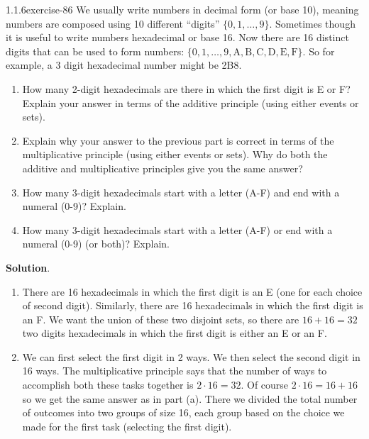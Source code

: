 \documentclass[twoside,11pt,]{book}
\numberwithin{equation}{chapter}
\begin{document}
\begin{divisionsolution}{1.1.6}{}{exercise-86}%
\hypertarget{p-1359}{}%
We usually write numbers in decimal form (or base 10), meaning numbers are composed using 10 different ``digits'' \(\{0,1,\ldots, 9\}\text{.}\) Sometimes though it is useful to write numbers hexadecimal or base 16. Now there are 16 distinct digits that can be used to form numbers: \(\{0, 1, \ldots, 9, \mathrm{A, B, C, D, E, F}\}\text{.}\) So for example, a 3 digit hexadecimal number might be 2B8.\leavevmode%
\begin{enumerate}[label=(\alph*)]
\item\hypertarget{li-1012}{}\hypertarget{p-1360}{}%
How many 2-digit hexadecimals are there in which the first digit is E or F? Explain your answer in terms of the additive principle (using either events or sets).%
\item\hypertarget{li-1013}{}\hypertarget{p-1362}{}%
Explain why your answer to the previous part is correct in terms of the multiplicative principle (using either events or sets). Why do both the additive and multiplicative principles give you the same answer?%
\item\hypertarget{li-1014}{}\hypertarget{p-1363}{}%
How many 3-digit hexadecimals start with a letter (A-F) and end with a numeral (0-9)? Explain.%
\item\hypertarget{li-1015}{}\hypertarget{p-1365}{}%
How many 3-digit hexadecimals start with a letter (A-F) or end with a numeral (0-9) (or both)? Explain.%
\end{enumerate}
%
\par\smallskip%
\noindent\textbf{Solution}.\quad%
\hypertarget{p-1367}{}%
\leavevmode%
\begin{enumerate}[label=(\alph*)]
\item\hypertarget{li-1016}{}\hypertarget{p-1368}{}%
There are 16 hexadecimals in which the first digit is an E (one for each choice of second digit). Similarly, there are 16 hexadecimals in which the first digit is an F. We want the union of these two disjoint sets, so there are \(16 + 16 = 32\) two digits hexadecimals in which the first digit is either an E or an F.%
\item\hypertarget{li-1017}{}\hypertarget{p-1369}{}%
We can first select the first digit in 2 ways. We then select the second digit in 16 ways. The multiplicative principle says that the number of ways to accomplish both these tasks together is \(2 \cdot 16 = 32\text{.}\) Of course \(2 \cdot 16 = 16 + 16\) so we get the same answer as in part (a). There we divided the total number of outcomes into two groups of size 16, each group based on the choice we made for the first task (selecting the first digit).%

\end{enumerate}
\end{divisionsolution}
\end{document}

